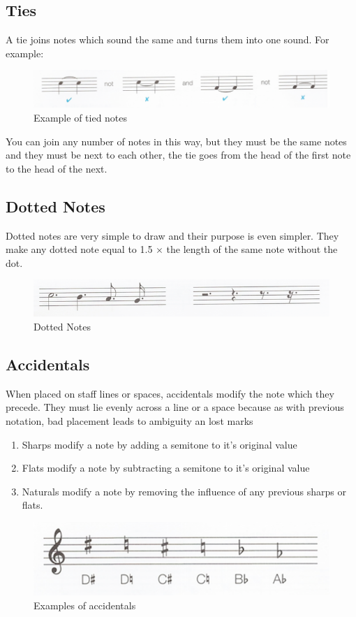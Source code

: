 \subsection {Ties}

A tie joins notes which sound the same and turns them into one sound. For example:

\begin{figure}[h!]
  \includegraphics[width=\linewidth]{gfx/basic/ties.png}
  \centering
  \caption{Example of tied notes}
  \label{fig:TiedNotes}
\end{figure}

You can join any number of notes in this way, but they must be the same notes and they must be next to each other, the tie goes from the head of the first note to the head of the next.

\subsection{Dotted Notes}

Dotted notes are very simple to draw and their purpose is even simpler. They make any dotted note equal to 1.5 $\times$ the length of the same note without the dot.

\begin{figure}[h!]
  \includegraphics[width=\linewidth]{gfx/basic/dotted-notes.png}
  \centering
  \caption{Dotted Notes}
  \label{fig:DottedNotes}
\end{figure}

\subsection{Accidentals}

When placed on staff lines or spaces, accidentals modify the note which they precede. They must lie evenly across a line or a space because as with previous notation, bad placement leads to ambiguity an lost marks

\begin{enumerate}
\item Sharps modify a note by adding a semitone to it's original value
\item Flats modify a note by subtracting a semitone to it's original value
\item Naturals modify a note by removing the influence of any previous sharps or flats.
\end{enumerate}

\begin{figure}[h!]
  \includegraphics[width=\linewidth]{gfx/basic/accidentals.png}
  \centering
  \caption{Examples of accidentals}
  \label{fig:Accidentals}
\end{figure}
